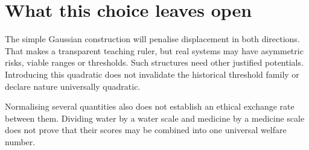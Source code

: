 \section{What this choice leaves open}
The simple Gaussian construction will penalise displacement in both directions. That makes a transparent teaching ruler, but real systems may have asymmetric risks, viable ranges or thresholds. Such structures need other justified potentials. Introducing this quadratic does not invalidate the historical threshold family or declare nature universally quadratic.

Normalising several quantities also does not establish an ethical exchange rate between them. Dividing water by a water scale and medicine by a medicine scale does not prove that their scores may be combined into one universal welfare number.


